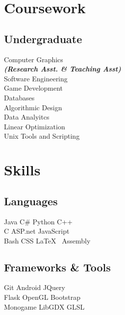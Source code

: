 \documentclass[]{deedy-resume-openfont}
\begin{document}
\begin{minipage}[t]{0.33\textwidth}

\section{Coursework}
\subsection{Undergraduate}
Computer Graphics \\
{\footnotesize \textit{\textbf{(Research Asst. \& Teaching Asst) }}} \\
Software Engineering \\
Game Development \\
Databases \\
Algorithmic Design \\
Data Analyitcs \\
Linear Optimization \\  
Unix Tools and Scripting \\
\sectionsep


\section{Skills}
\subsection{Languages}
Java \textbullet{} C\# \textbullet{} Python \textbullet{} C++ \\
C\textbullet{} ASP.net \textbullet{} JavaScript \\ 
Bash\textbullet{} CSS \textbullet{} \LaTeX\ \textbullet{} Assembly \\
\sectionsep
\sectionsep
\subsection{Frameworks \& Tools}
Git \textbullet{}  Android \textbullet{} JQuery  \\
Flask\textbullet{} OpenGL\textbullet{} Bootstrap \\ 
Monogame \textbullet{} LibGDX \textbullet{} GLSL
\sectionsep



\end{minipage}
\end{document}
